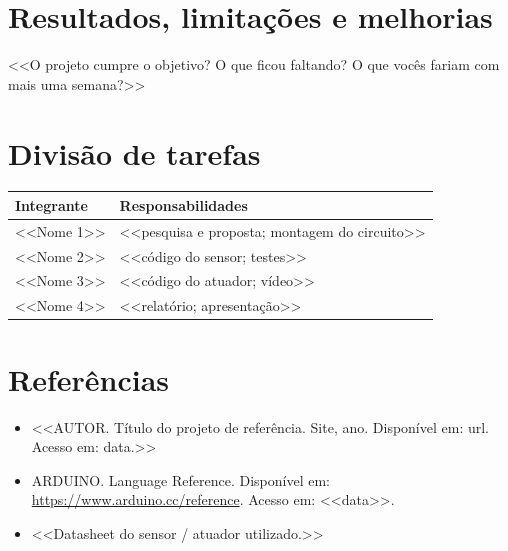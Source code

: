 \documentclass[12pt,a4paper]{article}
\begin{document}
\section{Resultados, limitações e melhorias}
<<O projeto cumpre o objetivo? O que ficou faltando? O que vocês fariam com mais uma semana?>>

\section{Divisão de tarefas}
\begin{table}[H]
  \centering
  \begin{tabular}{ll}
    \toprule
    \textbf{Integrante} & \textbf{Responsabilidades} \\
    \midrule
    <<Nome 1>> & <<pesquisa e proposta; montagem do circuito>> \\
    <<Nome 2>> & <<código do sensor; testes>> \\
    <<Nome 3>> & <<código do atuador; vídeo>> \\
    <<Nome 4>> & <<relatório; apresentação>> \\
    \bottomrule
  \end{tabular}
\end{table}

\section*{Referências}
\begin{itemize}
  \item <<AUTOR. Título do projeto de referência. Site, ano. Disponível em: url. Acesso em: data.>>
  \item ARDUINO. Language Reference. Disponível em: \url{https://www.arduino.cc/reference}. Acesso em: <<data>>.
  \item <<Datasheet do sensor / atuador utilizado.>>
\end{itemize}
\end{document}
